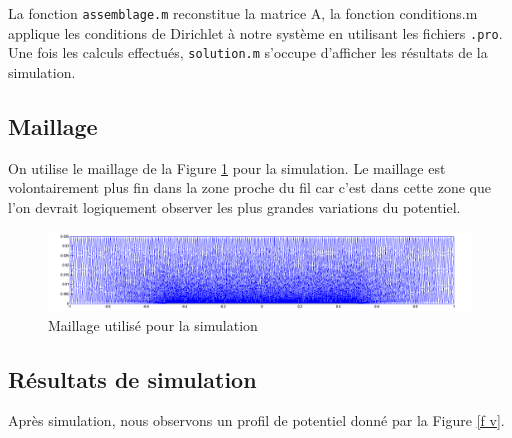 \documentclass[a4paper,12pt]{article}
\begin{document}
La fonction \verb|assemblage.m| reconstitue la matrice A, la fonction conditions.m applique les conditions de Dirichlet à notre système en utilisant les fichiers \verb|.pro|. Une fois les calculs effectués, \verb|solution.m| s'occupe d'afficher les résultats de la simulation.


\subsection{Maillage}
On utilise le maillage de la Figure \ref{f mesh} pour la simulation. Le maillage est volontairement plus fin dans la zone proche du fil car c'est dans cette zone que l'on devrait logiquement observer les plus grandes variations du potentiel.
\begin{figure}[h]
\centering
\includegraphics[width=1\textwidth,height=0.25 \textwidth]{images/mesh}
\caption{Maillage utilisé pour la simulation}
\label{f mesh}
\end{figure}

\subsection{Résultats de simulation}
Après simulation, nous observons un profil de potentiel donné par la Figure \ref{f v}.
\end{document}
